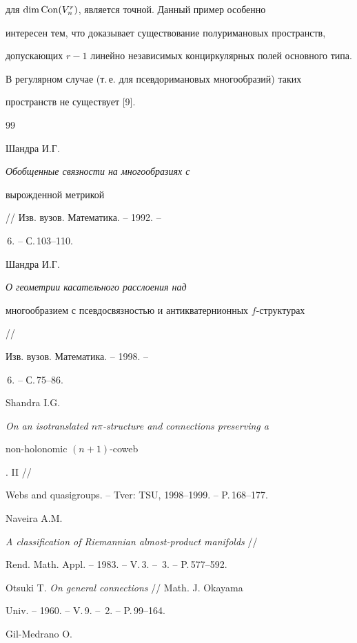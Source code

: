для $\dim\operatorname{Con}(V^r_n)$, является точной. Данный пример особенно


интересен тем, что доказывает существование полуримановых пространств,


допускающих $r-1$ линейно независимых конциркулярных полей основного типа.


В регулярном случае (т.\,е. для псевдоримановых многообразий) таких


пространств не существует [9].





\begin{thebibliography}{99}







Шандра И.Г. {\em Обобщенные связности на многообразиях с


вырожденной метрикой} // Изв. вузов. Математика. -- 1992. --


\No\,6. -- С.\,103--110.




Шандра И.Г. {\em О геометрии касательного расслоения над


многообразием с псевдосвязностью и антикватернионных $f$-структурах} //


Изв. вузов. Математика. -- 1998. --


\No\,6. -- С.\,75--86.




Shandra I.G.


{\em On an isotranslated $n\pi$-structure and connections preserving a


non-holonomic $(n+1)$-coweb}. II //


Webs and quasigroups. -- Tver: TSU, 1998--1999. -- P.\,168--177.




Naveira A.M.


{\em A classification of Riemannian almost-product manifolds} //


Rend. Math. Appl. -- 1983. -- V.\,3. -- \No\,3. -- P.\,577--592.




Otsuki T. {\em On general connections} // Math. J. Okayama


Univ. -- 1960. -- V.\,9. -- \No\,2. -- P.\,99--164.




Gil-Medrano O.



\end{thebibliography}
